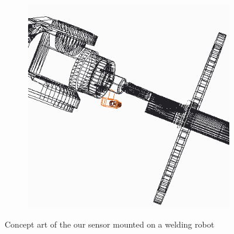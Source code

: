 \begin{figure}[h]
\begin{subfigure}[b]{0.3\textwidth}
\includegraphics[width=\textwidth]{graphics/CAD3}
\end{subfigure}
\caption{Concept art of the our sensor mounted on a welding robot}
\label{concept_cad}
\end{figure}